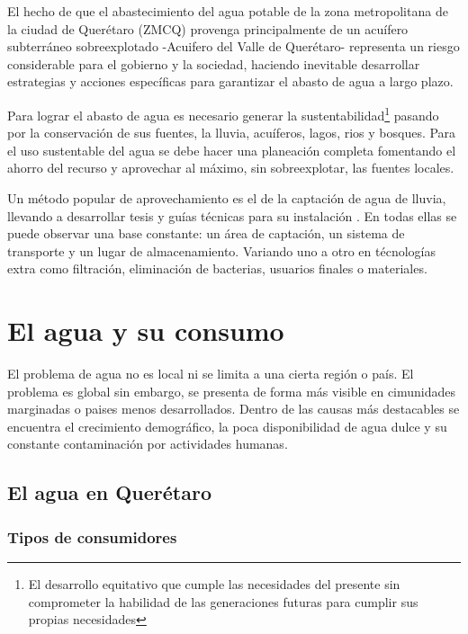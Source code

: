 \documentclass[letterpaper,12pt,oneside]{book}
\begin{document}
    El hecho de que el abastecimiento del agua potable de la zona metropolitana de la ciudad de Querétaro (ZMCQ) provenga principalmente de un acuífero subterráneo sobreexplotado -Acuifero del Valle de Querétaro- representa un riesgo considerable para el gobierno y la sociedad, haciendo inevitable desarrollar estrategias y acciones específicas para garantizar el abasto de agua a largo plazo.

    Para lograr el abasto de agua es necesario generar la sustentabilidad\footnote{El desarrollo equitativo que cumple las necesidades del presente sin comprometer la habilidad de las generaciones futuras para cumplir sus propias necesidades} pasando por la conservación de sus fuentes, la lluvia, acuíferos, lagos, rios y bosques. Para el uso sustentable del agua se debe hacer una planeación completa fomentando el ahorro del recurso y aprovechar al máximo, sin sobreexplotar, las fuentes locales.

    Un método popular de aprovechamiento es el de la captación de agua de lluvia, llevando a desarrollar tesis \cite{comision2016lineamientos} \cite{hugues2019captacion} \cite{nickisch2018sistemas} \cite{van2013captacion} y guías técnicas para su instalación \cite{queralt2011agua} \cite{unatsabar2004guia}. En todas ellas se puede observar una base constante: un área de captación, un sistema de transporte y un lugar de almacenamiento. Variando uno a otro en técnologías extra como filtración, eliminación de bacterias, usuarios finales o materiales.


\chapter{El agua y su consumo}
    El problema de agua no es local ni se limita a una cierta región o país. El problema es global sin embargo, se presenta de forma más visible en cimunidades marginadas o paises menos desarrollados. Dentro de las causas más destacables se encuentra el crecimiento demográfico, la poca disponibilidad de agua dulce y su constante contaminación por actividades humanas.
    \section{El agua en Querétaro}
        \subsection{Tipos de consumidores}
\end{document}

